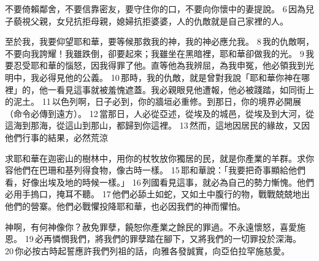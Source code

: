 不要倚賴鄰舍，不要信靠密友，要守住你的口，不要向你懷中的妻提說。 6 因為兒子藐視父親，女兒抗拒母親，媳婦抗拒婆婆，人的仇敵就是自己家裡的人。


至於我，我要仰望耶和華，要等候那救我的神，我的神必應允我。 8 我的仇敵啊，不要向我誇耀！我雖跌倒，卻要起來；我雖坐在黑暗裡，耶和華卻做我的光。 9 我要忍受耶和華的惱怒，因我得罪了他。直等他為我辨屈，為我申冤，他必領我到光明中，我必得見他的公義。 10 那時，我的仇敵，就是曾對我說「耶和華你神在哪裡」的，他一看見這事就被羞愧遮蓋。我必親眼見他遭報，他必被踐踏，如同街上的泥土。 11 以色列啊，日子必到，你的牆垣必重修。到那日，你的境界必開展（命令必傳到遠方）。 12 當那日，人必從亞述，從埃及的城邑，從埃及到大河，從這海到那海，從這山到那山，都歸到你這裡。 13 然而，這地因居民的緣故，又因他們行事的結果，必然荒涼



求耶和華在迦密山的樹林中，用你的杖牧放你獨居的民，就是你產業的羊群。求你容他們在巴珊和基列得食物，像古時一樣。 15 耶和華說：「我要把奇事顯給他們看，好像出埃及地的時候一樣。」 16 列國看見這事，就必為自己的勢力慚愧。他們必用手摀口，掩耳不聽。 17 他們必舔土如蛇，又如土中腹行的物，戰戰兢兢地出他們的營寨。他們必戰懼投降耶和華，也必因我們的神而懼怕。


神啊，有何神像你？赦免罪孽，饒恕你產業之餘民的罪過。不永遠懷怒，喜愛施恩。 19 必再憐憫我們，將我們的罪孽踏在腳下，又將我們的一切罪投於深海。 20 你必按古時起誓應許我們列祖的話，向雅各發誠實，向亞伯拉罕施慈愛。











